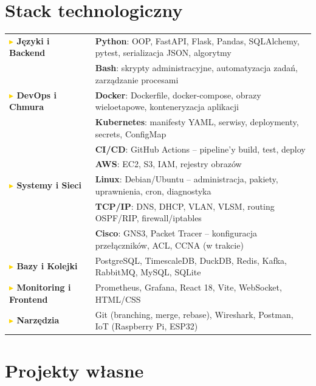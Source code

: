 \documentclass[a4paper,10pt]{article}
\newcommand{\tech}[2]{\textbf{#1}: #2}
\begin{document}
\vspace{0.4em}

\section{Stack technologiczny}

\small
\renewcommand{\arraystretch}{1.15}
\begin{tabularx}{\textwidth}{>{\bfseries\color{navy}}p{3.8cm} X}
\textcolor{gold}{$\blacktriangleright$} Języki i Backend &
  \tech{Python}{OOP, FastAPI, Flask, Pandas, SQLAlchemy, pytest, serializacja JSON, algorytmy} \\
  & \tech{Bash}{skrypty administracyjne, automatyzacja zadań, zarządzanie procesami} \\
\textcolor{gold}{$\blacktriangleright$} DevOps i Chmura &
  \tech{Docker}{Dockerfile, docker-compose, obrazy wieloetapowe, konteneryzacja aplikacji} \\
  & \tech{Kubernetes}{manifesty YAML, serwisy, deploymenty, secrets, ConfigMap} \\
  & \tech{CI/CD}{GitHub Actions -- pipeline'y build, test, deploy} \\
  & \tech{AWS}{EC2, S3, IAM, rejestry obrazów} \\
\textcolor{gold}{$\blacktriangleright$} Systemy i Sieci &
  \tech{Linux}{Debian/Ubuntu -- administracja, pakiety, uprawnienia, cron, diagnostyka} \\
  & \tech{TCP/IP}{DNS, DHCP, VLAN, VLSM, routing OSPF/RIP, firewall/iptables} \\
  & \tech{Cisco}{GNS3, Packet Tracer -- konfiguracja przełączników, ACL, CCNA (w trakcie)} \\
\textcolor{gold}{$\blacktriangleright$} Bazy i Kolejki &
  PostgreSQL, TimescaleDB, DuckDB, Redis, Kafka, RabbitMQ, MySQL, SQLite \\
\textcolor{gold}{$\blacktriangleright$} Monitoring i Frontend &
  Prometheus, Grafana, React 18, Vite, WebSocket, HTML/CSS \\
\textcolor{gold}{$\blacktriangleright$} Narzędzia &
  Git (branching, merge, rebase), Wireshark, Postman, IoT (Raspberry Pi, ESP32)
\end{tabularx}

\vspace{0.4em}

\section{Projekty własne}
\end{document}
